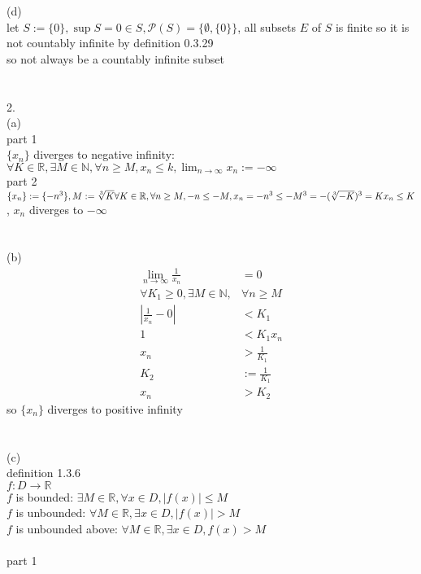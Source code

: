 \documentclass[12pt, border = 4pt, multi]{article} %
\begin{document}
(d)\\
let $S := \{0\}, \sup S = 0 \in S, \mathcal{P}(S) = \{\emptyset, \{0\}\}$, all subsets $E$ of $S$ is finite so it is not countably infinite by definition 0.3.29\\
so not always be a countably infinite subset\\
\\
\\
2.\\
(a)\\
part 1\\
$\{x_n\}$ diverges to negative infinity: $\forall K \in \mathbb{R}, \exists M \in \mathbb{N}, \forall n \geq M, x_n \leq k, \lim_{n \rightarrow \infty} x_n := -\infty$\\
part 2\\
$\{x_n\} := \{-n ^ 3\}, M := \sqrt[3]{K}\\
\forall K \in \mathbb{R}, \forall n \geq M, -n \leq -M, x_n = -n ^ 3 \leq -M ^ 3 = -(\sqrt[3]{-K}) ^ 3 = K\\
x_n \leq K$, $x_n$ diverges to $-\infty$\\
\\
\\
(b)\\
\begin{align*}
\lim_{n \rightarrow \infty} \frac{1}{x_n} &= 0\\
\forall K_1 \geq 0, \exists M \in \mathbb{N}, &\forall n \geq M\\
\left|\frac{1}{x_n} - 0\right| &< K_1\\
1 &< K_1 x_n\\
x_n &> \frac{1}{K_1}\\
K_2 &:= \frac{1}{K_1}\\
x_n &> K_2
\end{align*}
so $\{x_n\}$ diverges to positive infinity\\
\\
\\
(c)\\
definition 1.3.6\\
$f: D \rightarrow \mathbb{R}$\\
$f$ is bounded: $\exists M \in \mathbb{R}, \forall x \in D, |f(x)| \leq M$\\
$f$ is unbounded: $\forall M \in \mathbb{R}, \exists x \in D, |f(x)| > M$\\
$f$ is unbounded above: $\forall M \in \mathbb{R}, \exists x \in D, f(x) > M$\\
\\
part 1\\
\end{document}
